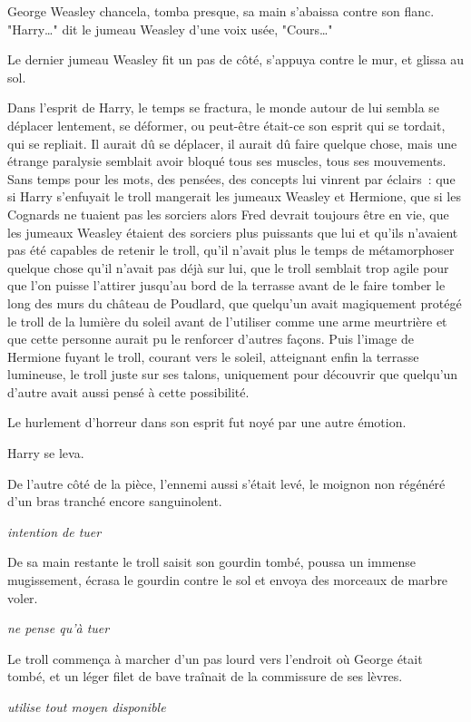 George Weasley chancela, tomba presque, sa main s'abaissa contre son flanc. "Harry…" dit le jumeau Weasley d'une voix usée, "Cours…"

Le dernier jumeau Weasley fit un pas de côté, s'appuya contre le mur, et glissa au sol.

Dans l'esprit de Harry, le temps se fractura, le monde autour de lui sembla se déplacer lentement, se déformer, ou peut-être était-ce son esprit qui se tordait, qui se repliait. Il aurait dû se déplacer, il aurait dû faire quelque chose, mais une étrange paralysie semblait avoir bloqué tous ses muscles, tous ses mouvements. Sans temps pour les mots, des pensées, des concepts lui vinrent par éclairs~: que si Harry s'enfuyait le troll mangerait les jumeaux Weasley et Hermione, que si les Cognards ne tuaient pas les sorciers alors Fred devrait toujours être en vie, que les jumeaux Weasley étaient des sorciers plus puissants que lui et qu'ils n'avaient pas été capables de retenir le troll, qu'il n'avait plus le temps de métamorphoser quelque chose qu'il n'avait pas déjà sur lui, que le troll semblait trop agile pour que l'on puisse l'attirer jusqu'au bord de la terrasse avant de le faire tomber le long des murs du château de Poudlard, que quelqu'un avait magiquement protégé le troll de la lumière du soleil avant de l'utiliser comme une arme meurtrière et que cette personne aurait pu le renforcer d'autres façons. Puis l'image de Hermione fuyant le troll, courant vers le soleil, atteignant enfin la terrasse lumineuse, le troll juste sur ses talons, uniquement pour découvrir que quelqu'un d'autre avait aussi pensé à cette possibilité.

Le hurlement d'horreur dans son esprit fut noyé par une autre émotion.

Harry se leva.

De l'autre côté de la pièce, l'ennemi aussi s'était levé, le moignon non régénéré d'un bras tranché encore sanguinolent.

\emph{intention de tuer}

De sa main restante le troll saisit son gourdin tombé, poussa un immense mugissement, écrasa le gourdin contre le sol et envoya des morceaux de marbre voler.

\emph{ne pense qu'à tuer}

Le troll commença à marcher d'un pas lourd vers l'endroit où George était tombé, et un léger filet de bave traînait de la commissure de ses lèvres.

\emph{utilise tout moyen disponible}

